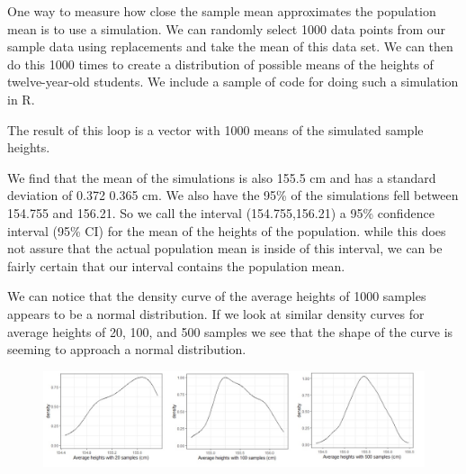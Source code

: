 \documentclass[
]{book}
\newenvironment{Shaded}{\begin{snugshade}}{\end{snugshade}}
\newcommand{\AttributeTok}[1]{\textcolor[rgb]{0.77,0.63,0.00}{#1}}
\newcommand{\CommentTok}[1]{\textcolor[rgb]{0.56,0.35,0.01}{\textit{#1}}}
\newcommand{\ConstantTok}[1]{\textcolor[rgb]{0.00,0.00,0.00}{#1}}
\newcommand{\ControlFlowTok}[1]{\textcolor[rgb]{0.13,0.29,0.53}{\textbf{#1}}}
\newcommand{\DecValTok}[1]{\textcolor[rgb]{0.00,0.00,0.81}{#1}}
\newcommand{\FunctionTok}[1]{\textcolor[rgb]{0.00,0.00,0.00}{#1}}
\newcommand{\NormalTok}[1]{#1}
\newcommand{\OtherTok}[1]{\textcolor[rgb]{0.56,0.35,0.01}{#1}}
\newcommand{\SpecialCharTok}[1]{\textcolor[rgb]{0.00,0.00,0.00}{#1}}
\theoremstyle{definition}
\theoremstyle{definition}
\theoremstyle{definition}
\theoremstyle{definition}
\theoremstyle{remark}
\begin{document}
One way to measure how close the sample mean approximates the population mean is to use a simulation. We can randomly select 1000 data points from our sample data using replacements and take the mean of this data set. We can then do this 1000 times to create a distribution of possible means of the heights of twelve-year-old students. We include a sample of code for doing such a simulation in R.

\begin{Shaded}
\end{Shaded}

The result of this loop is a vector with 1000 means of the simulated sample heights.

We find that the mean of the simulations is also 155.5 cm and has a standard deviation of 0.372 0.365 cm. We also have the 95\% of the simulations fell between 154.755 and 156.21. So we call the interval (154.755,156.21) a 95\% confidence interval (95\% CI) for the mean of the heights of the population. while this does not assure that the actual population mean is inside of this interval, we can be fairly certain that our interval contains the population mean.

We can notice that the density curve of the average heights of 1000 samples appears to be a normal distribution. If we look at similar density curves for average heights of 20, 100, and 500 samples we see that the shape of the curve is seeming to approach a normal distribution.

\begin{figure}

{\centering \includegraphics[width=1\linewidth]{images/heights_averages} 

}

\end{figure}
\end{document}
